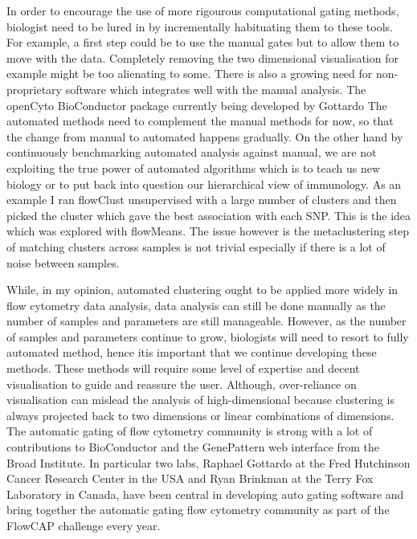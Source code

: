 In order to encourage the use of more rigourous computational gating methods, biologist need to be lured in by incrementally habituating them to these tools.
For example, a first step could be to use the manual gates but to allow them to move with the data.
Completely removing the two dimensional visualisation for example might be too alienating to some.
There is also a growing need for non-proprietary software which integrates well with the manual analysis.
The openCyto BioConductor package currently being developed by Gottardo
The automated methods need to complement the manual methods for now, so that the change from manual to automated happens gradually.
On the other hand by continuously benchmarking automated analysis against manual,
we are not exploiting the true power of automated algorithms which is to teach us new biology or to put back into question our hierarchical view of immunology.
As an example I ran flowClust unsupervised with a large number of clusters and then picked the cluster which gave the best association with each SNP.
This is the idea which was explored with flowMeans.  The issue however is the metaclustering step of matching clusters across samples is not trivial especially if
there is a lot of noise between samples.


While, in my opinion, automated clustering ought to be applied more widely in flow cytometry data analysis, data analysis can still be done manually as the number of samples and parameters are still manageable.
However, as the number of samples and parameters continue to grow, biologists will need to resort to fully automated method, hence itis important that we continue developing these methods.
These methods will require some level of expertise and decent visualisation to guide and reassure the user.
Although, over-reliance on visualisation can mislead the analysis of high-dimensional because clustering is always projected back to two dimensions or linear combinations of dimensions.
The automatic gating of flow cytometry community is strong with a lot of contributions to BioConductor and the GenePattern web interface from the Broad Institute.
In particular two labs, Raphael Gottardo at the Fred Hutchinson Cancer Research Center in the USA and Ryan Brinkman at the Terry Fox Laboratory in Canada, have been central in developing auto gating software and bring together the automatic gating flow cytometry community as part of the FlowCAP challenge every year.


